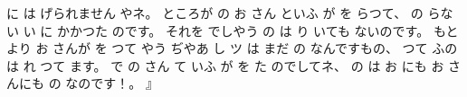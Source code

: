 に
は
げられません
やネ。
%
ところが
の
お
さん
といふ
が
を
らつて、
%
の
らない
い
に
かかつた
のです。
%
それを
でしやう
の
は
り
いても
ないのです。
%
もとより
お
さんが
を
つて
やう
ぢやあ
し
ツ
は
まだ
の
なんですもの、
%
つて
ふのは
れ
つて
ます。
%
で
の
さん
て
いふ
が
を
た
のでしてネ、
%
の
は
お
にも
お
さんにも
の
なのです！。
』
